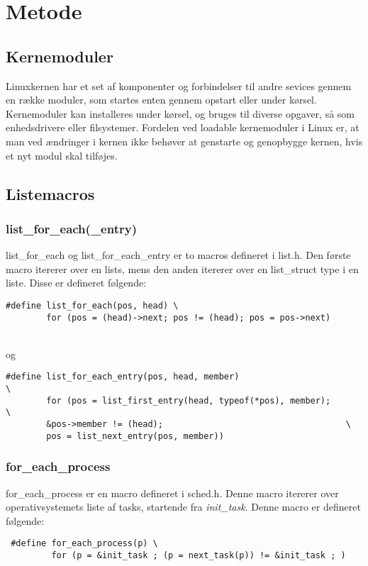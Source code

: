 \section{Metode}
\subsection{Kernemoduler}
Linuxkernen har et set af komponenter og forbindelser til andre sevices gennem en række moduler, som startes enten gennem opstart eller under kørsel. Kernemoduler kan installeres under kørsel, og bruges til diverse opgaver, så som enhedsdrivere eller filsystemer. Fordelen ved loadable kernemoduler i Linux er, at man ved ændringer i kernen ikke behøver at genstarte og genopbygge kernen, hvis et nyt modul skal tilføjes.
\subsection{Listemacros}
\subsubsection{list\_for\_each(\_entry)}
list\_for\_each og list\_for\_each\_entry er to macros defineret i list.h. Den første macro itererer over en lists, mens den anden itererer over en list\_struct type i en liste.
Disse er defineret følgende:\\
\begin{lstlisting}
#define list_for_each(pos, head) \
        for (pos = (head)->next; pos != (head); pos = pos->next)
\end{lstlisting}
\\og\\
\begin{lstlisting}
#define list_for_each_entry(pos, head, member)                          \
        for (pos = list_first_entry(head, typeof(*pos), member);        \
        &pos->member != (head);                                    \
        pos = list_next_entry(pos, member))
\end{lstlisting}
\subsubsection{for\_each\_process}
for\_each\_process er en macro defineret i sched.h. Denne macro itererer over operativsystemets liste af tasks, startende fra \textit{init\_task}. Denne macro er defineret følgende:\\
\begin{lstlisting}
 #define for_each_process(p) \
         for (p = &init_task ; (p = next_task(p)) != &init_task ; )
\end{lstlisting}
